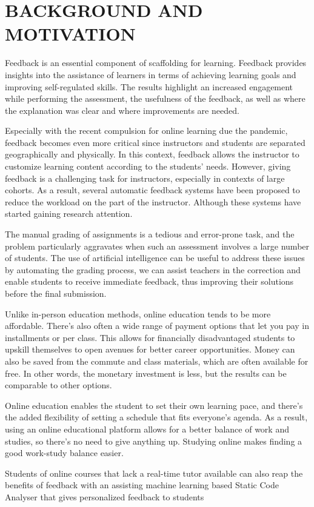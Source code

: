 
\chapter{BACKGROUND AND MOTIVATION} %
%

Feedback is an essential component of scaffolding for learning. Feedback provides insights into the assistance of learners in terms of achieving learning goals and improving self-regulated skills. The results highlight an increased engagement while performing the assessment, the usefulness of the feedback, as well as where the explanation was clear and where improvements are needed. 

Especially with the recent compulsion for online learning due the pandemic, feedback becomes even more critical since instructors and students are separated geographically and physically. In this context, feedback allows the instructor to customize learning content according to the students’ needs. However, giving feedback is a challenging task for instructors, especially in contexts of large cohorts. As a result, several automatic feedback systems have been proposed to reduce the workload on the part of the instructor. Although these systems have started gaining research attention.

The manual grading of assignments is a tedious and error-prone task, and the problem particularly aggravates when such an assessment involves a large number of students. The use of artificial intelligence can be useful to address these issues by automating the grading process, we can assist teachers in the correction and enable students to receive immediate feedback, thus improving their solutions before the final submission.

Unlike in-person education methods, online education tends to be more affordable. There’s also often a wide range of payment options that let you pay in installments or per class. This allows for financially disadvantaged students to upskill themselves to open avenues for better career opportunities. Money can also be saved from the commute and class materials, which are often available for free. In other words, the monetary investment is less, but the results can be comparable to other options. 

Online education enables the student to set their own learning pace, and there’s the added flexibility of setting a schedule that fits everyone’s agenda. As a result, using an online educational platform allows for a better balance of work and studies, so there’s no need to give anything up. Studying online makes finding a good work-study balance easier.

Students of online courses that lack a real-time tutor available can also reap the benefits of feedback with an assisting machine learning based Static Code Analyser that gives personalized feedback to students 


